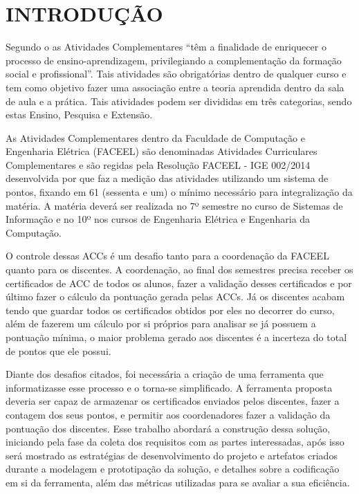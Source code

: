 \chapter{INTRODUÇÃO}
\label{chap:introducao}

Segundo o \cite{min_educ_perguntas} as Atividades Complementares “têm a finalidade de enriquecer o processo de ensino-aprendizagem, privilegiando a complementação da formação social e profissional”. Tais atividades são obrigatórias dentro de qualquer curso e tem como objetivo fazer uma associação entre a teoria aprendida dentro da sala de aula e a prática. Tais atividades podem ser divididas em três categorias, sendo estas Ensino, Pesquisa e Extensão.

As Atividades Complementares dentro da Faculdade de Computação e Engenharia Elétrica (FACEEL) são denominadas Atividades Curriculares Complementares e são regidas pela Resolução FACEEL - IGE 002/2014 desenvolvida por \cite{faceel2014regulamento} que faz a medição das atividades utilizando um sistema de pontos, fixando em 61 (sessenta e um) o mínimo necessário para integralização da matéria. A matéria deverá ser realizada no 7º semestre no curso de Sistemas de Informação e no 10º nos cursos de Engenharia Elétrica e Engenharia da Computação.

O controle dessas ACCs é um desafio tanto para a coordenação da FACEEL quanto para os discentes. A coordenação, ao final dos semestres precisa receber os certificados de ACC de todos os alunos, fazer a validação desses certificados e por último fazer o cálculo da pontuação gerada pelas ACCs. Já os discentes acabam tendo que guardar todos os certificados obtidos por eles no decorrer do curso, além de fazerem um cálculo por si próprios para analisar se já possuem a pontuação mínima, o maior problema gerado aos discentes é a incerteza do total de pontos que ele possui.

Diante dos desafios citados, foi necessária a criação de uma ferramenta que informatizasse esse processo e o torna-se simplificado. A ferramenta proposta deveria ser capaz de armazenar os certificados enviados pelos discentes, fazer a contagem dos seus pontos, e permitir aos coordenadores fazer a validação da pontuação dos discentes. Esse trabalho abordará a construção dessa solução, iniciando pela fase da coleta dos requisitos com as partes interessadas, após isso será mostrado as estratégias de desenvolvimento do projeto e artefatos criados durante a modelagem e prototipação da solução, e detalhes sobre a codificação em si da ferramenta, além das métricas utilizadas para se avaliar a sua eficiência.

